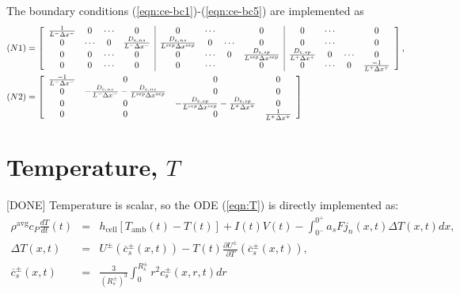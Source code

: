 \documentclass[12pt]{article}
\newcommand{\green}[1]{{\color{green}#1}}
\begin{document}
The boundary conditions (\ref{eqn:ce-bc1})-(\ref{eqn:ce-bc5}) are implemented as
\begin{align}
(N1) &=
\left[
\begin{array}{cccc | cccc | cccc}
  \frac{1}{L^{-} \Delta x^{-}} & 0 & \cdots & 0 & 0 & \cdots & & 0 & 0 & \cdots & & 0\\
  0 & \cdots & 0 & \frac{D_{e,ns}}{L^{-}\Delta x^{-}} & \frac{D_{e,ns}}{L^{sep}\Delta x^{sep}} & 0 & \cdots & 0 & 0 & \cdots & & 0\\
  0 & 0 & \cdots & 0 & 0 & \cdots & 0 & \frac{D_{e,sp}}{L^{sep}\Delta x^{sep}} & \frac{D_{e,sp}}{L^{+}\Delta x^{+}} & 0 & \cdots & 0\\
  0 & 0 & \cdots & 0 & 0 & \cdots & & 0 & 0 & \cdots & 0 & \frac{-1}{L^{+} \Delta x^{+}}
\end{array}
\right], \\
(N2) &= 
\left[
\begin{array}{cccc}
  \frac{-1}{L^{-} \Delta x^{-}} & 0  & 0 & 0 \\
  0 & -\frac{D_{e,ns}}{L^{-} \Delta x^{-}} - \frac{D_{e,ns}}{L^{sep} \Delta x^{sep}}  & 0  & 0 \\
  0 & 0  & -\frac{D_{e,sp}}{L^{sep} \Delta x^{sep}} - \frac{D_{e,sp}}{L^{+} \Delta x^{+}} & 0 \\
  0 & 0  & 0  & \frac{1}{L^{+} \Delta x^{+}}
\end{array}
\right]
\end{align}


\section{Temperature, $T$}\label{sec:T}
\green{[DONE]} Temperature is scalar, so the ODE (\ref{eqn:T}) is directly implemented as:
\begin{eqnarray}
\rho^{\textrm{avg}} c_{P} \frac{dT}{dt}(t) &=& h_{\textrm{cell}} \left[ T_{\textrm{amb}}(t) - T(t) \right] + I(t) V(t) -\int_{0^{-}}^{0^{+}} a_{s} F j_{n}(x,t) \Delta T(x,t) dx, \\
\Delta T(x,t) &=& U^{\pm}(\overline{c}^{\pm}_{s}(x,t)) - T(t) \frac{\partial U^{\pm}}{\partial T}(\overline{c}^{\pm}_{s}(x,t)), \\
\overline{c}_{s}^{\pm}(x,t) &=& \frac{3}{(R_{s}^{\pm})^{3}} \int_{0}^{R_{s}^{\pm}} r^{2} c_{s}^{\pm}(x,r,t) dr 
\end{eqnarray}

\end{document}
